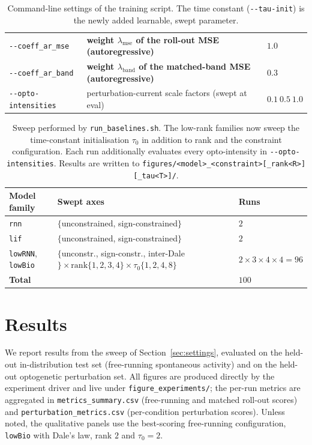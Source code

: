 \documentclass[11pt]{article}
\newcommand{\code}[1]{\texttt{#1}}
\begin{document}
\begin{table}[t]
\begin{tabular}{@{}lll@{}}
\code{-{}-coeff\_ar\_mse} & \textbf{weight $\lambda_{\mathrm{mse}}$ of the roll-out MSE (autoregressive)} & $1.0$ \\
\code{-{}-coeff\_ar\_band} & \textbf{weight $\lambda_{\mathrm{band}}$ of the matched-band MSE (autoregressive)} & $0.3$ \\
\code{-{}-opto-intensities} & perturbation-current scale factors (swept at eval) & $0.1\ 0.5\ 1.0$ \\
\bottomrule
\end{tabular}
\caption{Command-line settings of the training script. The time constant
(\code{-{}-tau-init}) is the newly added learnable, swept parameter.}
\label{tab:settings}
\end{table}

\begin{table}[t]
\centering
\small
\begin{tabular}{@{}lll@{}}
\toprule
Model family & Swept axes & Runs \\
\midrule
\code{rnn} & $\{$unconstrained, sign-constrained$\}$ & $2$ \\
\code{lif} & $\{$unconstrained, sign-constrained$\}$ & $2$ \\
\code{lowRNN}, \code{lowBio} &
$\{$unconstr., sign-constr., inter-Dale$\}\times\text{rank}\{1,2,3,4\}\times\tau_0\{1,2,4,8\}$ &
$2\times 3\times 4\times 4 = 96$ \\
\midrule
\multicolumn{2}{l}{\textbf{Total}} & $100$ \\
\bottomrule
\end{tabular}
\caption{Sweep performed by \code{run\_baselines.sh}. The low-rank families now
sweep the time-constant initialisation $\tau_0$ in addition to rank and the
constraint configuration. Each run additionally evaluates every opto-intensity in
\code{-{}-opto-intensities}. Results are written to
\code{figures/<model>\_<constraint>[\_rank<R>][\_tau<T>]/}.}
\label{tab:sweep}
\end{table}

\section{Results}
\label{sec:results}
We report results from the sweep of Section~\ref{sec:settings}, evaluated on the
held-out in-distribution test set (free-running spontaneous activity) and on the
held-out optogenetic perturbation set. All figures are produced directly by the
experiment driver and live under \code{figure\_experiments/}; the per-run metrics
are aggregated in \code{metrics\_summary.csv} (free-running and matched roll-out
scores) and \code{perturbation\_metrics.csv} (per-condition perturbation scores).
Unless noted, the qualitative panels use the best-scoring free-running
configuration, \code{lowBio} with Dale's law, rank $2$ and $\tau_0=2$.
\end{document}
